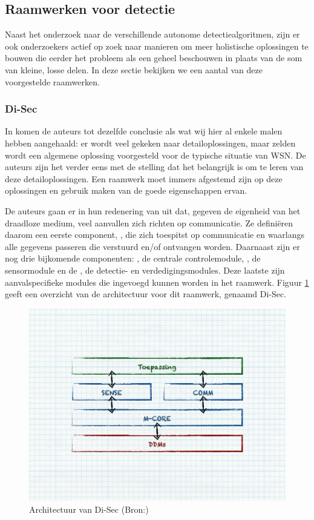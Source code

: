 
\subsection{Raamwerken voor detectie}
\label{subsection:frameworks}

Naast het onderzoek naar de verschillende autonome detectiealgoritmen, zijn er
ook onderzoekers actief op zoek naar manieren om meer holistische oplossingen
te bouwen die eerder het probleem als een geheel beschouwen in plaats van de
som van kleine, losse delen. In deze sectie bekijken we een aantal van deze
voorgestelde raamwerken.

\subsubsection*{Di-Sec}
\label{subsubsection:di-sec}

In \citep{valero2012di} komen de auteurs tot dezelfde conclusie als wat wij
hier al enkele malen hebben aangehaald: er wordt veel gekeken naar
detailoplossingen, maar zelden wordt een algemene oplossing voorgesteld voor de
typische situatie van WSN. De auteurs zijn het verder eens met de stelling dat
het belangrijk is om te leren van deze detailoplossingen. Een raamwerk moet
immers afgestemd zijn op deze oplossingen en gebruik maken van de goede
eigenschappen ervan.

De auteurs gaan er in hun redenering van uit dat, gegeven de eigenheid van het
draadloze medium, veel aanvallen zich richten op communicatie. Ze defini\"eren
daarom een eerste component, , die zich toespitst op communicatie en
waarlangs alle gegevens passeren die verstuurd en/of ontvangen worden.
Daarnaast zijn er nog drie bijkomende componenten: , de centrale
controlemodule, , de sensormodule en de , de detectie- en
verdedigingsmodules. Deze laatste zijn aanvalspecifieke modules die ingevoegd
kunnen worden in het raamwerk. Figuur \ref{fig:di-sec-architecture} geeft een
overzicht van de architectuur voor dit raamwerk, genaamd Di-Sec.

\begin{figure}[ht]
  \centering
  \includegraphics[width=0.8\linewidth]{resources/di-sec-architecture.pdf}
  \caption[Architectuur van Di-Sec]{Architectuur van Di-Sec (Bron:\citep{valero2012di})}
  \label{fig:di-sec-architecture}
\end{figure}

